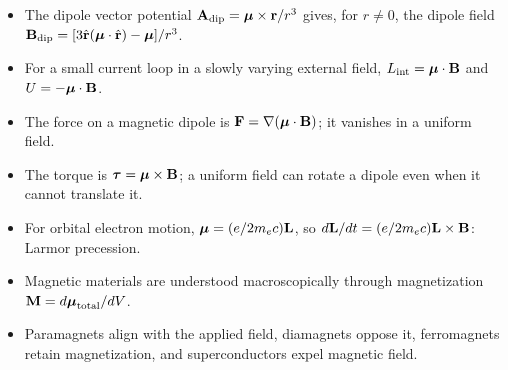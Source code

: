 \begin{itemize}
  \item The dipole vector potential $\mathbf{A}_{\rm dip}=\boldsymbol{\mu}\times\mathbf{r}/r^3$ gives, for
        $r\neq0$, the dipole field
        $\mathbf{B}_{\rm dip}=[3\hat{\mathbf{r}}(\boldsymbol{\mu}\cdot\hat{\mathbf{r}})-\boldsymbol{\mu}]/r^3$.
  \item For a small current loop in a slowly varying external field,
        $L_{\rm int}=\boldsymbol{\mu}\cdot\mathbf{B}$ and $U=-\boldsymbol{\mu}\cdot\mathbf{B}$.
  \item The force on a magnetic dipole is $\mathbf{F}=\nabla(\boldsymbol{\mu}\cdot\mathbf{B})$; it vanishes
        in a uniform field.
  \item The torque is $\boldsymbol{\tau}=\boldsymbol{\mu}\times\mathbf{B}$; a uniform field can rotate
        a dipole even when it cannot translate it.
  \item For orbital electron motion, $\boldsymbol{\mu}=(e/2m_ec)\mathbf{L}$, so
        $d\mathbf{L}/dt=(e/2m_ec)\mathbf{L}\times\mathbf{B}$: Larmor precession.
  \item Magnetic materials are understood macroscopically through magnetization
        $\mathbf{M}=d\boldsymbol{\mu}_{\rm total}/dV$.
  \item Paramagnets align with the applied field, diamagnets oppose it, ferromagnets
        retain magnetization, and superconductors expel magnetic field.
\end{itemize}
